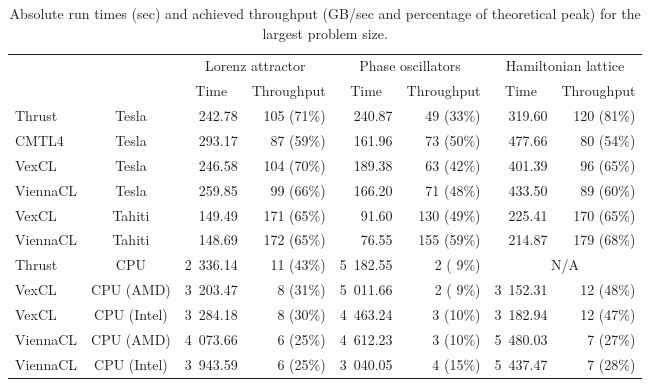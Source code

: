 \documentclass[final]{siamltex}
\begin{document}
\begin{table}
    \begin{small}
    \caption{Absolute run times (sec) and achieved throughput (GB/sec and
    percentage of theoretical peak) for the largest problem size.}
    \label{tab:abstimes}
    \begin{tabular}{|lc|rrrrrr|}
        \hline
        & & \multicolumn{2}{|c|}{Lorenz attractor}
          & \multicolumn{2}{|c|}{Phase oscillators}
          & \multicolumn{2}{|c|}{Hamiltonian lattice} \\
        \cline{3-8}
        & & \multicolumn{1}{c}{Time} & \multicolumn{1}{|c|}{Throughput}
          & \multicolumn{1}{c}{Time} & \multicolumn{1}{|c|}{Throughput}
          & \multicolumn{1}{c}{Time} & \multicolumn{1}{|c|}{Throughput} \\
        \hline
        Thrust   & Tesla       &   242.78 & 105 (71\%) &   240.87 &  49 (33\%) &  319.60 & 120 (81\%) \\
        CMTL4    & Tesla       &   293.17 &  87 (59\%) &   161.96 &  73 (50\%) &  477.66 &  80 (54\%) \\
        VexCL    & Tesla       &   246.58 & 104 (70\%) &   189.38 &  63 (42\%) &  401.39 &  96 (65\%) \\
        ViennaCL & Tesla       &   259.85 &  99 (66\%) &   166.20 &  71 (48\%) &  433.50 &  89 (60\%) \\
        \hline
        VexCL    & Tahiti      &   149.49 & 171 (65\%) &    91.60 & 130 (49\%) &  225.41 & 170 (65\%) \\
        ViennaCL & Tahiti      &   148.69 & 172 (65\%) &    76.55 & 155 (59\%) &  214.87 & 179 (68\%) \\
        \hline
        Thrust   & CPU         & 2~336.14 &  11 (43\%) & 5~182.55 &   2 ( 9\%) & \multicolumn{2}{c|}{N/A} \\
        VexCL    & CPU (AMD)   & 3~203.47 &   8 (31\%) & 5~011.66 &   2 ( 9\%) & 3~152.31 &  12 (48\%) \\
        VexCL    & CPU (Intel) & 3~284.18 &   8 (30\%) & 4~463.24 &   3 (10\%) & 3~182.94 &  12 (47\%) \\
        ViennaCL & CPU (AMD)   & 4~073.66 &   6 (25\%) & 4~612.23 &   3 (10\%) & 5~480.03 &   7 (27\%) \\
        ViennaCL & CPU (Intel) & 3~943.59 &   6 (25\%) & 3~040.05 &   4 (15\%) & 5~437.47 &   7 (28\%) \\
        \hline
    \end{tabular}
    \end{small}
\end{table}
\end{document}
